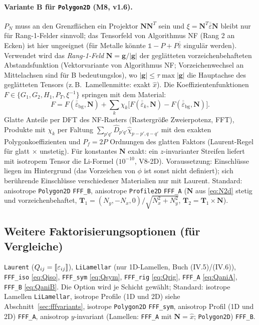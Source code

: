 \paragraph{Variante B für \texttt{Polygon2D} (M8, v1.6).} $P_N$ muss an den Grenzflächen ein Projektor
$\mathbf N\mathbf N^T$ sein und $\xi=\mathbf N^T\overline{\overline\varepsilon}\mathbf N$ bleibt nur für Rang-1-Felder
sinnvoll; das Tensorfeld von Algorithmus NF (Rang 2 an Ecken) ist hier ungeeignet (für Metalle könnte
$\mathbb 1-P+P\overline{\overline\varepsilon}$ singulär werden). Verwendet wird das \emph{Rang-1-Feld}
$\mathbf N=\mathbf g/|\mathbf g|$ der geglätteten vorzeichenbehafteten Abstandsfunktion (Vektorvariante von
Algorithmus NF; Vorzeichenwechsel an Mittelachsen sind für B bedeutungslos), wo $|\mathbf g|\le\tau\max|\mathbf g|$
die Hauptachse des geglätteten Tensors (z.\,B.\ Lamellenmitte: exakt $\hat x$). Die Koeffizientenfunktionen
$F\in\{G_1,G_2,H_1,P_T,\xi^{-1}\}$ springen mit dem Material:
\[
  F=F(\overline{\overline\varepsilon}_{\text{bg}},\mathbf N)+\textstyle\sum_k\chi_k\big[F(\overline{\overline\varepsilon}_k,\mathbf N)-F(\overline{\overline\varepsilon}_{\text{bg}},\mathbf N)\big].
\]
Glatte Anteile per DFT des NF-Rasters (Rastergröße Zweierpotenz, FFT), Produkte mit $\chi_k$ per Faltung
$\sum_{p'q'}\hat D_{p'q'}\hat\chi_{p-p',q-q'}$ mit den exakten Polygonkoeffizienten und $P_f=2P$ Ordnungen des
glatten Faktors (Laurent-Regel für glatt $\times$ unstetig). Für konstantes $\mathbf N$ exakt: ein
$z$-invarianter Streifen liefert mit isotropem Tensor die Li-Formel ($10^{-10}$, V8-2D). Voraussetzung:
Einschlüsse liegen im Hintergrund (das Vorzeichen von $\phi$ ist sonst nicht definiert); sich berührende
Einschlüsse verschiedener Materialien nur mit Laurent. Standard: anisotrope \texttt{Polygon2D} \verb|FFF_B|,
anisotrope \texttt{Profile2D} \verb|FFF_A| ($\mathbf N$ aus \eqref{eq:N2d} stetig und vorzeichenbehaftet,
$\mathbf T_1=(N_y,-N_x,0)/\sqrt{N_x^2+N_y^2}$, $\mathbf T_2=\mathbf T_1\times\mathbf N$).

\subsection{Weitere Faktorisierungsoptionen (für Vergleiche)}
\verb|Laurent| ($Q_{ij}=[\![\varepsilon_{ij}]\!]$), \verb|LiLamellar| (nur 1D-Lamellen, Buch (IV.5)/(IV.6)),
\verb|FFF_iso| \eqref{eq:Qiso}, \verb|FFF_sym| \eqref{eq:Qsym}, \verb|FFF_rig| \eqref{eq:Qrig},
\verb|FFF_A| \eqref{eq:QaniA}, \verb|FFF_B| \eqref{eq:QaniB}.
Die Option wird je Schicht gewählt; Standard: isotrope Lamellen \verb|LiLamellar|, isotrope Profile (1D und 2D) siehe
Abschnitt~\ref{sec:fffvariants}, isotrope \texttt{Polygon2D} \verb|FFF_sym|, anisotrop Profil (1D und 2D) \verb|FFF_A|,
anisotrop $y$-invariant (Lamellen: \verb|FFF_A| mit $\mathbf N=\hat x$; \texttt{Polygon2D}) \verb|FFF_B|.

